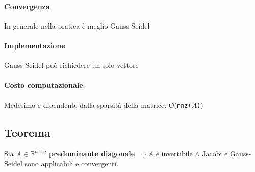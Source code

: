 \documentclass[10pt]{book}
\begin{document}
\paragraph{Convergenza} In generale nella pratica è meglio Gauss-Seidel
\paragraph{Implementazione} Gauss-Seidel può richiedere un solo vettore
\paragraph{Costo computazionale} Medesimo e dipendente dalla sparsità della matrice: O(\texttt{nnz(}$A$\texttt{)})
\subsection{Teorema} Sia $A \in \mathbb{R}^{n \times n}$ \textbf{predominante diagonale} $\Rightarrow A$ è invertibile $\wedge$ Jacobi e Gauss-Seidel sono applicabili e convergenti.
\end{document}
